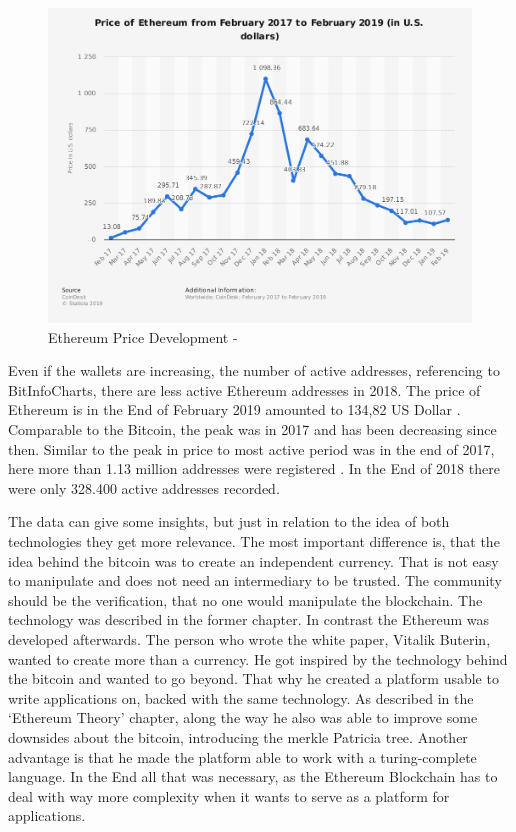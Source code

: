 \begin{figure}[h]
  \centering
  \includegraphics[width=\linewidth]{figures/EthereumPrice.png}
  \caption{Ethereum Price Development - \cite{statPriceEther}}
  \label{fig:marketcapEthereum}
\end{figure}

Even if the wallets are increasing, the number of active addresses, referencing to BitInfoCharts, there are less active Ethereum addresses in 2018. 
The price of Ethereum is in the End of February 2019 amounted to 134,82 US Dollar \cite{statPriceEther}.
Comparable to the Bitcoin, the peak was in 2017 and has been decreasing since then. 
Similar to the peak in price to most active period was in the end of 2017, here more than 1.13 million addresses were registered \cite{Partz2018}. In the End of 2018 there were only 328.400 active addresses recorded. 

The data can give some insights, but just in relation to the idea of both technologies they get more relevance. 
The most important difference is, that the idea behind the bitcoin was to create an independent currency.
That is not easy to manipulate and does not need an intermediary to be trusted. 
The community should be the verification, that no one would manipulate the blockchain. 
The technology was described in the former chapter. 
In contrast the Ethereum was developed afterwards. 
The person who wrote the white paper, Vitalik Buterin, wanted to create more than a currency. \cite{vitalikwhite}
He got inspired by the technology behind the bitcoin and wanted to go beyond. 
That why he created a platform usable to write applications on, backed with the same technology. 
As described in the ‘Ethereum Theory’ chapter, along the way he also was able to improve some downsides about the bitcoin, introducing the merkle Patricia tree. 
Another advantage is that he made the platform able to work with a turing-complete language. 
In the End all that was necessary, as the Ethereum Blockchain has to deal with way more complexity when it wants to serve as a platform for applications.
